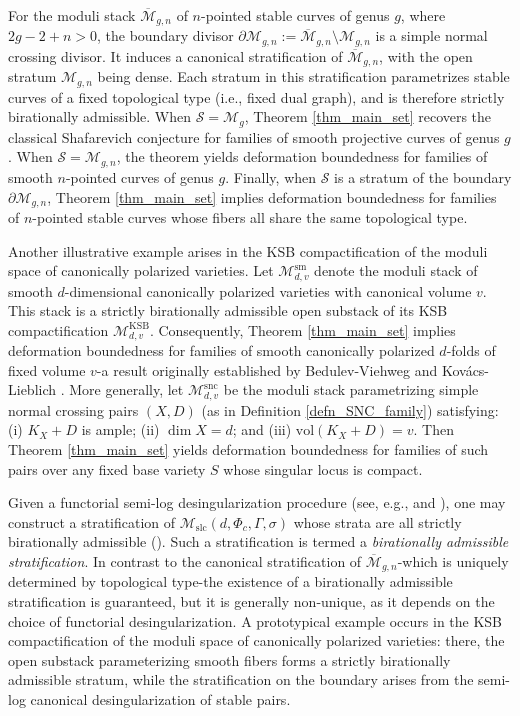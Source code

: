 \documentclass[11pt,letterpaper]{amsart}
\numberwithin{equation}{section}
\begin{document}
    For the moduli stack $\overline{\mathcal{M}}_{g,n}$ of $n$-pointed stable curves of genus $g$, where $2g - 2 + n > 0$, the boundary divisor $\partial \mathcal{M}_{g,n} := \overline{\mathcal{M}}_{g,n} \setminus \mathcal{M}_{g,n}$ is a simple normal crossing divisor. It induces a canonical stratification of $\overline{\mathcal{M}}_{g,n}$, with the open stratum $\mathcal{M}_{g,n}$ being dense. Each stratum in this stratification parametrizes stable curves of a fixed topological type (i.e., fixed dual graph), and is therefore strictly birationally admissible. When $\mathcal{S} = \mathcal{M}_g$, Theorem \ref{thm_main_set} recovers the classical Shafarevich conjecture for families of smooth projective curves of genus $g$. When $\mathcal{S} = \mathcal{M}_{g,n}$, the theorem yields deformation boundedness for families of smooth $n$-pointed curves of genus $g$. Finally, when $\mathcal{S}$ is a  stratum of the boundary $\partial \mathcal{M}_{g,n}$, Theorem \ref{thm_main_set} implies deformation boundedness for families of $n$-pointed stable curves whose fibers all share the same topological type.
	
	Another illustrative example arises in the KSB compactification of the moduli space of canonically polarized varieties. Let $\mathcal{M}^{\mathrm{sm}}_{d,v}$ denote the moduli stack of smooth $d$-dimensional canonically polarized varieties with canonical volume $v$. This stack is a strictly birationally admissible open substack of its KSB compactification $\mathcal{M}^{\mathrm{KSB}}_{d,v}$. Consequently, Theorem \ref{thm_main_set} implies deformation boundedness for families of smooth canonically polarized $d$-folds of fixed volume $v$-a result originally established by Bedulev-Viehweg \cite{Viehweg2000} and Kov\'acs-Lieblich \cite{Kovacs2011}. More generally, let $\mathcal{M}^{\mathrm{snc}}_{d,v}$ be the moduli stack parametrizing simple normal crossing pairs $(X,D)$ (as in Definition \ref{defn_SNC_family}) satisfying: (i) $K_X + D$ is ample; (ii) $\dim X = d$; and (iii) $\mathrm{vol}(K_X + D) = v$. Then Theorem \ref{thm_main_set} yields deformation boundedness for families of such pairs over any fixed base variety $S$ whose singular locus is compact.
	
	Given a functorial semi-log desingularization procedure (see, e.g., \cite{Bierstone2013} and \cite[\S 10.4]{Kollar2013}), one may construct a stratification of $\mathcal{M}_{\mathrm{slc}}(d,\Phi_c,\Gamma,\sigma)$ whose strata are all strictly birationally admissible (\cite[\S 6]{stjc2025}). Such a stratification is termed a \emph{birationally admissible stratification}. In contrast to the canonical stratification of $\overline{\mathcal{M}}_{g,n}$-which is uniquely determined by topological type-the existence of a birationally admissible stratification is guaranteed, but it is generally non-unique, as it depends on the choice of functorial desingularization. A prototypical example occurs in the KSB compactification of the moduli space of canonically polarized varieties: there, the open substack parameterizing smooth fibers forms a strictly birationally admissible stratum, while the stratification on the boundary arises from the semi-log canonical desingularization of stable pairs.
	
\end{document}
